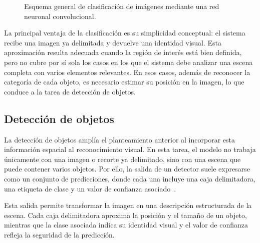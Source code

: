 \begin{figure}[H]
{
    }
    \caption{Esquema general de clasificación de imágenes mediante una red neuronal convolucional.}
    \label{fig:clasificacion-imagenes-cnn}
\end{figure}

La principal ventaja de la clasificación es su simplicidad conceptual: el sistema recibe una imagen ya delimitada y devuelve una identidad visual. Esta aproximación resulta adecuada cuando la región de interés está bien definida, pero no cubre por sí sola los casos en los que el sistema debe analizar una escena completa con varios elementos relevantes. En esos casos, además de reconocer la categoría de cada objeto, es necesario estimar su posición en la imagen, lo que conduce a la tarea de detección de objetos.

\subsection{Detección de objetos}

La detección de objetos amplía el planteamiento anterior al incorporar esta información espacial al reconocimiento visual. En esta tarea, el modelo no trabaja únicamente con una imagen o recorte ya delimitado, sino con una escena que puede contener varios objetos. Por ello, la salida de un detector suele expresarse como un conjunto de predicciones, donde cada una incluye una caja delimitadora, una etiqueta de clase y un valor de confianza asociado~\cite{szeliski2022computerVision}.

Esta salida permite transformar la imagen en una descripción estructurada de la escena. Cada caja delimitadora aproxima la posición y el tamaño de un objeto, mientras que la clase asociada indica su identidad visual y el valor de confianza refleja la seguridad de la predicción.

